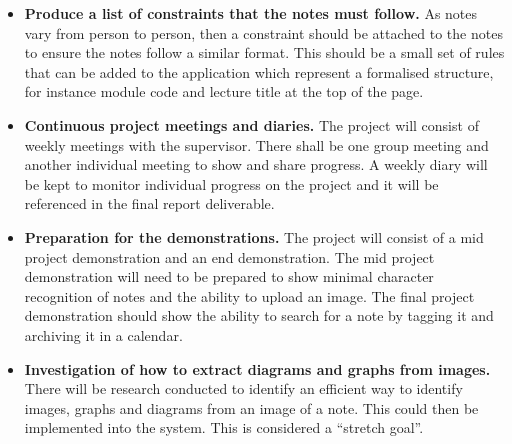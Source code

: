 \documentclass[11pt,fleqn,twoside]{article}
\begin{document}
\begin{itemize}
\begin{itemize}
  \end{itemize}

\item \textbf{Produce a list of constraints that the notes must follow.} As notes vary from person to person, then a constraint should be attached to the notes to ensure the notes follow a similar format. This should be a small set of rules that can be added to the application which represent a formalised structure, for instance module code and lecture title at the top of the page.

\item \textbf{Continuous project meetings and diaries.} The project will consist of weekly meetings with the supervisor. There shall be one group meeting and another individual meeting to show and share progress. A weekly diary will be kept to monitor individual progress on the project and it will be referenced in the final report deliverable.

\item \textbf{Preparation for the demonstrations.} The project will consist of a mid project demonstration and an end demonstration. The mid project demonstration will need to be prepared to show minimal character recognition of notes and the ability to upload an image. The final project demonstration should show the ability to search for a note by tagging it and archiving it in a calendar.

\item \textbf{Investigation of how to extract diagrams and graphs from images.} There will be research conducted to identify an efficient way to identify images, graphs and diagrams from an image of a note. This could then be implemented into the system. This is considered a ``stretch goal''.

\end{itemize}

\end{document}
